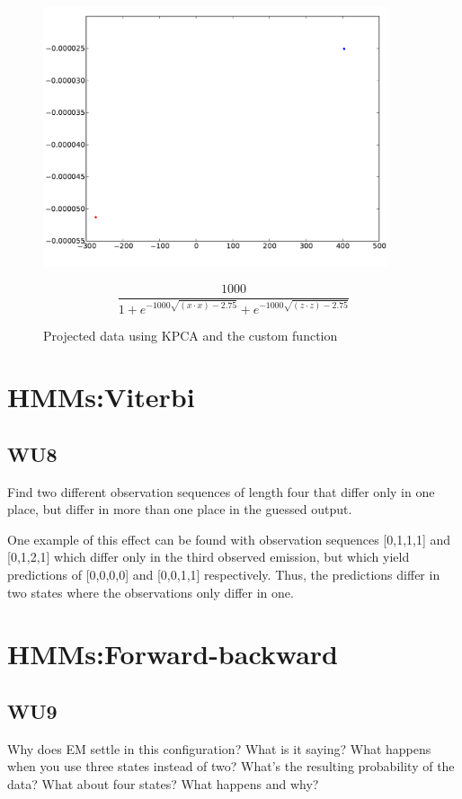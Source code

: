 \documentclass[a4paper,11pt]{article}
\begin{document}
\begin{figure}[!ht]
  \begin{center}
  \includegraphics[width=4in]{WU7_final.pdf}
  \caption{Projected data using KPCA and the custom function}
  \[\frac{1000}{1 + e^{-1000 \sqrt{(x \cdot x) - 2.75}} + e^{-1000 \sqrt{(z \cdot z) - 2.75}}}\] 
  \label{figures:WU7_final}
  \end{center}
\end{figure}

\newpage
\section{HMMs:Viterbi}
\subsection{WU8}
\textsf{Find two different observation sequences of length four that
differ only in one place, but differ in more than one place in the
guessed output.}\vspace{0.1in}


One example of this effect can be found with observation sequences
[0,1,1,1] and [0,1,2,1] which differ only in the third observed emission,
but which yield predictions of [0,0,0,0] and [0,0,1,1] respectively.
Thus, the predictions differ in two states where the observations only
differ in one.

\section{HMMs:Forward-backward}
\subsection{WU9}
\textsf{Why does EM settle in this configuration? What is it saying? 
What happens when you use three states instead of two? 
What's the resulting probability of the data? 
What about four states? What happens and why?}\vspace{0.1in}
\end{document}
